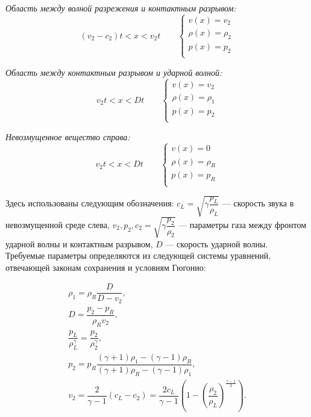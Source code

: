 \documentclass[a4paper]{article}
\begin{document}
	\textit{Область между волной разрежения и контактным разрывом:}
	\begin{equation}
	(v_2 - c_2) t <	x < v_2 t		\qquad
	\begin{cases}
	v (x)		=	v_2		\\
	\rho (x)	=	\rho_2	\\
	p (x)		=	p_2		\\
	\end{cases}
	\end{equation}
	
	\textit{Область между контактным разрывом и ударной волной:}
	\begin{equation}
	v_2 t <	x < D t		\qquad
	\begin{cases}
	v (x)		=	v_2		\\
	\rho (x)	=	\rho_1	\\
	p (x)		=	p_2		\\
	\end{cases}
	\end{equation}
	
	\textit{Невозмущенное вещество справа:}
	\begin{equation}
	v_2 t <	x < D t		\qquad
	\begin{cases}
	v (x)		=	0		\\
	\rho (x)	=	\rho_R	\\
	p (x)		=	p_R		\\
	\end{cases}
	\end{equation}
	
	Здесь использованы следующим обозначения: $c_L = \sqrt{\gamma \dfrac{p_L}{\rho_L}}$ --- скорость звука в невозмущенной среде слева, $v_2, p_2, c_2 = \sqrt{\gamma \dfrac{p_2}{\rho_2}}$ --- параметры газа между фронтом ударной волны и контактным разрывом, $D$ --- скорость ударной волны.
	Требуемые параметры определяются из следующей системы уравнений, отвечающей законам сохранения и условиям Гюгонио:
	
	\begin{gather}
		\rho_1 = \rho_R \dfrac{D}{D-v_2}	,\\[5pt]
		D = \dfrac{p_2 - p_R}{\rho_R v_2}	,\\[5pt]
		\dfrac{p_L}{\rho_L^\gamma} = \dfrac{p_2}{\rho_2^\gamma}	,\\[5pt]
		p_2 = p_R \dfrac{(\gamma + 1)\rho_1 - (\gamma-1)\rho_R}
						{(\gamma + 1)\rho_R - (\gamma-1)\rho_1}	,\\[5pt]		
		v_2 = \dfrac{2}{\gamma-1}\left(c_L-c_2\right) = \dfrac{2c_L}{\gamma-1} \left(1 - \left(\dfrac{\rho_2}{\rho_L}\right)^{\frac{\gamma-1}{2}}\right)	.
	\end{gather}
	
	
	
	
\end{document}
